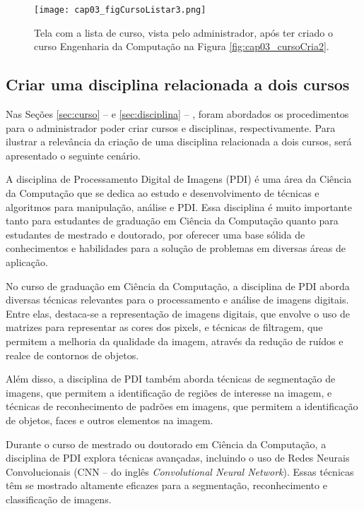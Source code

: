 \begin{figure}[!ht]
  \centering
  \texttt{[image: cap03\_figCursoListar3.png]}
  \caption{Tela com a lista de curso, vista pelo  administrador, após ter criado o curso Engenharia da Computação na Figura \ref{fig:cap03_cursoCria2}.}
  \label{fig:cap03_figCursoListar3}
\end{figure}

\subsection{Criar uma disciplina relacionada a dois cursos}

Nas Seções \ref{sec:curso} --  e \ref{sec:disciplina} -- , foram abordados os procedimentos para o administrador poder criar cursos e disciplinas, respectivamente. Para ilustrar a relevância da criação de uma disciplina relacionada a dois cursos, será apresentado o seguinte cenário.

A disciplina de Processamento Digital de Imagens (PDI) é uma área da Ciência da Computação que se dedica ao estudo e desenvolvimento de técnicas e algoritmos para manipulação, análise e PDI. Essa disciplina é muito importante tanto para estudantes de graduação em Ciência da Computação quanto para estudantes de mestrado e doutorado, por oferecer uma base sólida de conhecimentos e habilidades para a solução de problemas em diversas áreas de aplicação.

No curso de graduação em Ciência da Computação, a disciplina de PDI aborda diversas técnicas relevantes para o processamento e análise de imagens digitais. Entre elas, destaca-se a representação de imagens digitais, que envolve o uso de matrizes para representar as cores dos pixels, e técnicas de filtragem, que permitem a melhoria da qualidade da imagem, através da redução de ruídos e realce de contornos de objetos.

Além disso, a disciplina de PDI também aborda técnicas de segmentação de imagens, que permitem a identificação de regiões de interesse na imagem, e técnicas de reconhecimento de padrões em imagens, que permitem a identificação de objetos, faces e outros elementos na imagem.

Durante o curso de mestrado ou doutorado em Ciência da Computação, a disciplina de PDI explora técnicas avançadas, incluindo o uso de Redes Neurais Convolucionais (CNN -- do inglês \textit{Convolutional Neural Network}). Essas técnicas têm se mostrado altamente eficazes para a segmentação, reconhecimento e classificação de imagens.

